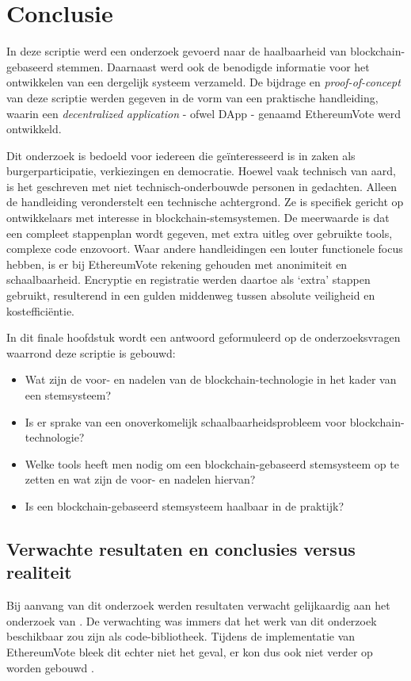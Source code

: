 

\chapter{Conclusie}
\label{ch:conclusie}
In deze scriptie werd een onderzoek gevoerd naar de haalbaarheid van blockchain-gebaseerd stemmen. Daarnaast werd ook de benodigde informatie voor het ontwikkelen van een dergelijk systeem  verzameld. De bijdrage en \textit{proof-of-concept} van deze scriptie werden gegeven in de vorm van een praktische handleiding, waarin een \textit{decentralized application} - ofwel DApp -  genaamd EthereumVote werd ontwikkeld. 

 Dit onderzoek is bedoeld voor iedereen die geïnteresseerd is in zaken als burgerparticipatie, verkiezingen en democratie. Hoewel vaak technisch van aard, is het geschreven met niet technisch-onderbouwde personen in gedachten. Alleen de handleiding veronderstelt een technische achtergrond. Ze is specifiek gericht op ontwikkelaars met interesse in blockchain-stemsystemen. De meerwaarde is dat een compleet stappenplan wordt  gegeven, met extra uitleg over gebruikte tools, complexe code enzovoort. Waar andere handleidingen een louter functionele focus hebben, is er bij EthereumVote rekening gehouden met anonimiteit en schaalbaarheid. Encryptie en registratie werden daartoe als `extra' stappen gebruikt, resulterend in een gulden middenweg tussen absolute veiligheid en kostefficiëntie.
 
In dit finale hoofdstuk wordt een antwoord geformuleerd op de onderzoeksvragen waarrond deze scriptie is gebouwd:
\begin{itemize}
	\item Wat zijn de voor- en nadelen van de blockchain-technologie in het kader van een stemsysteem?
	\item Is er sprake van een onoverkomelijk schaalbaarheidsprobleem voor blockchain-technologie?
	\item Welke tools heeft men nodig om een blockchain-gebaseerd stemsysteem op te zetten en wat zijn de voor- en nadelen hiervan?
	\item Is een blockchain-gebaseerd stemsysteem haalbaar in de praktijk?
\end{itemize}
\section{Verwachte resultaten en conclusies versus realiteit}
Bij aanvang van dit onderzoek werden resultaten verwacht gelijkaardig aan het onderzoek van \textcite{McCorry2017}. De verwachting was immers dat het werk van dit onderzoek beschikbaar zou zijn als code-bibliotheek. Tijdens de implementatie van EthereumVote bleek dit echter niet het geval, er kon dus ook niet  verder op worden gebouwd . 

